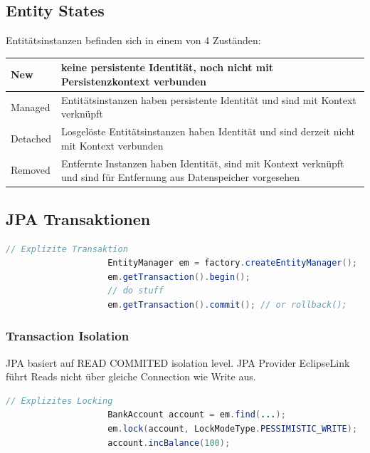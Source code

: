 \documentclass[a4paper, landscape, 8pt]{scrartcl}
\begin{document}
\begin{multicols*}{4}
        \subsection{Entity States}
        Entitätsinstanzen befinden sich in einem von 4 Zuständen: \\
        \begin{tabularx}{\columnwidth}{l | X}
            \hline
            New & keine persistente Identität, noch nicht mit Persistenzkontext verbunden\\
            \hline
            Managed & Entitätsinstanzen haben persistente Identität und sind mit Kontext verknüpft\\
            \hline
            Detached & Losgelöste Entitätsinstanzen haben Identität und sind derzeit nicht mit Kontext verbunden\\
            \hline
            Removed & Entfernte Instanzen haben Identität, sind mit Kontext verknüpft und sind für Entfernung aus Datenspeicher vorgesehen
        \end{tabularx}

        \subsection{JPA Transaktionen}
        \begin{lstlisting}[language=java]
                    // Explizite Transaktion
                    EntityManager em = factory.createEntityManager();
                    em.getTransaction().begin();
                    // do stuff
                    em.getTransaction().commit(); // or rollback();
        \end{lstlisting}

        \subsubsection{Transaction Isolation}
        JPA basiert auf READ COMMITED isolation level.
        JPA Provider EclipseLink führt Reads nicht über gleiche Connection wie Write aus.

        \begin{lstlisting}[language=java]
                    // Explizites Locking
                    BankAccount account = em.find(...);
                    em.lock(account, LockModeType.PESSIMISTIC_WRITE);
                    account.incBalance(100);
        \end{lstlisting}


\end{multicols*}
\end{document}
